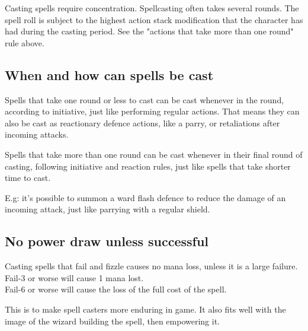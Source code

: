 Casting spells require concentration. Spellcasting often takes several rounds. The spell roll is subject to the highest action stack modification that the character has had during the casting period. See the "actions that take more than one round" rule above.


%


\subsection*{When and how can spells be cast}
Spells that take one round or less to cast can be cast whenever in the round, according to initiative, just like performing regular actions. That means they can also be cast as reactionary defence actions, like a parry, or retaliations after incoming attacks.

Spells that take more than one round can be cast whenever in their final round of casting, following initiative and reaction rules, just like spells that take shorter time to cast.

E.g: it's possible to summon a ward flash defence to reduce the damage of an incoming attack, just like parrying with a regular shield.


\subsection*{No power draw unless successful}
Casting spells that fail and fizzle causes no mana loss, unless it is a large failure. \\
Fail-3 or worse will cause 1 mana lost. \\
Fail-6 or worse will cause the loss of the full cost of the spell.

This is to make spell casters more enduring in game. It also fits well with the image of the wizard building the spell, then empowering it.


